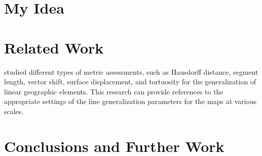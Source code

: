 \documentclass{article}
\begin{document}
\section{My Idea}
\label{sec:my_idea}

\section{Related Work}
\label{sec:related_work}

\cite{stanislawski2012automated} studied different types of metric assessments,
such as Hausdorff distance, segment length, vector shift, surface displacement,
and tortuosity for the generalization of linear geographic elements. This
research can provide references to the appropriate settings of the line
generalization parameters for the maps at various scales.

\section{Conclusions and Further Work}
\label{sec:conclusions_and_further_work}

\printbibliography
\end{document}
